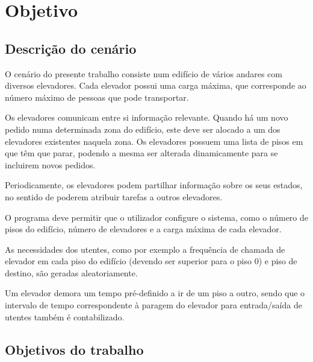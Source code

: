 \documentclass[a4paper]{article}
\begin{document}
\newpage

\tableofcontents



\newpage

\section{Objetivo}

\subsection{Descrição do cenário} 

O cenário do presente trabalho consiste num edifício de vários andares com diversos elevadores. Cada elevador possui uma carga máxima, que corresponde ao número máximo de pessoas que pode transportar.

Os elevadores comunicam entre si informação relevante. Quando há um novo pedido numa determinada zona do edifício, este deve ser alocado a um dos elevadores existentes naquela zona. Os elevadores possuem uma lista de pisos em que têm que parar, podendo a mesma ser alterada dinamicamente para se incluirem novos pedidos.

Periodicamente, os elevadores podem partilhar informação sobre os seus estados, no sentido de poderem atribuir tarefas a outros elevadores.

O programa deve permitir que o utilizador configure o sistema, como o número de pisos do edifício, número de elevadores e a carga máxima de cada elevador.

As necessidades dos utentes, como por exemplo a frequência de chamada de elevador em cada piso do edifício (devendo ser superior para o piso 0) e piso de destino, são geradas aleatoriamente. 

Um elevador demora um tempo pré-definido a ir de um piso a outro, sendo que o intervalo de tempo correspondente à paragem do elevador para entrada/saída de utentes também é contabilizado.

\subsection{Objetivos do trabalho} 
\end{document}
